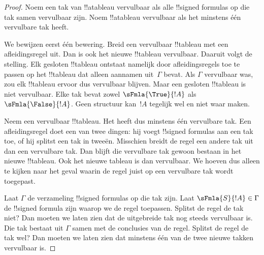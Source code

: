 \documentclass[openany]{memoir}
\begin{document}
\begin{proof}
Noem een tak van !!a{tableau} vervulbaar als alle !!{signed formula}s
op die tak samen vervulbaar zijn. Noem !!a{tableau} vervulbaar als het
minstens één vervulbare tak heeft.

We bewijzen eerst één bewering. Breid een vervulbaar !!{tableau} met
een afleidingsregel uit. Dan is ook het nieuwe !!{tableau} vervulbaar.
Daaruit volgt de stelling. Elk gesloten !!{tableau} ontstaat namelijk
door afleidingsregels toe te passen op het !!{tableau} dat alleen
aannamen uit~$\Gamma$ bevat. Als $\Gamma$ vervulbaar was, zou elk
!!{tableau} ervoor dus vervulbaar blijven. Maar een gesloten
!!{tableau} is niet vervulbaar. Elke tak bevat zowel
$\sFmla{\True}{!A}$ als $\sFmla{\False}{!A}$. Geen structuur kan~$!A$
tegelijk wel en niet waar maken.

Neem een vervulbaar !!{tableau}. Het heeft dus minstens één vervulbare
tak. Een afleidingsregel doet een van twee dingen: hij voegt
!!{signed formula}s aan een tak toe, of hij splitst een tak in tweeën.
Misschien breidt de regel een andere tak uit dan een vervulbare tak.
Dan blijft die vervulbare tak gewoon bestaan in het nieuwe
!!{tableau}. Ook het nieuwe tableau is dan vervulbaar. We hoeven dus
alleen te kijken naar het geval waarin de regel juist op een
vervulbare tak wordt toegepast.

Laat $\Gamma$ de verzameling !!{signed formula}s op die tak zijn. Laat
$\sFmla{S}{!A} \in \Gamma$ de !!{signed formula} zijn waarop we de
regel toepassen. Splitst de regel de tak niet? Dan moeten we laten zien
dat de uitgebreide tak nog steeds vervulbaar is. Die tak bestaat uit
$\Gamma$ samen met de conclusies van de regel. Splitst de regel de tak
wel? Dan moeten we laten zien dat minstens één van de twee nieuwe
takken vervulbaar is.
  

\end{proof}
\end{document}
